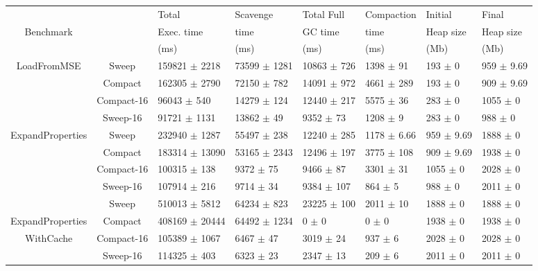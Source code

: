 \documentclass[10pt, sigplan]{acmart}
\begin{document}
\begin{figure}[thb]
\begin{tabular}{|c|c|l|l|l|l|l|l|}
   \hline
  & & Total   & Scavenge  & Total Full  & Compaction  & Initial  & Final \\
 Benchmark & &  Exec. time &  time & GC time &  time &  Heap size & Heap size \\
  & &  (ms) &  (ms) & (ms) &  (ms) &  (Mb) &  (Mb) \\
   \hline
   \multirow{4}{*}{LoadFromMSE} & Sweep 	& 159821 $\pm$ 2218 &	73599 $\pm$ 1281 	& 10863 $\pm$ 726 	&1398 $\pm$ 91 	& 193 $\pm$ 0 	& 959 $\pm$ 9.69 \\
    				    & Compact 	& 162305 $\pm$ 2790 &	72150 $\pm$ 782 	& 14091 $\pm$ 972 	&4661 $\pm$ 289 	& 193 $\pm$ 0 	& 909 $\pm$ 9.69 \\
    				    & Compact-16 	& 96043 $\pm$ 540 &	14279 $\pm$ 124 	& 12440 $\pm$ 217 	&5575 $\pm$ 36 	& 283 $\pm$ 0 	& 1055 $\pm$ 0 \\
    				    & Sweep-16 		& 91721 $\pm$ 1131 &	13862 $\pm$ 49 	& 9352 $\pm$ 73 	&1208 $\pm$ 9 	& 283 $\pm$ 0 	& 988 $\pm$ 0 \\
   \hline
   \multirow{4}{*}{ExpandProperties} 	& Sweep 		& 232940 $\pm$ 1287 &	55497 $\pm$ 238 	& 12240 $\pm$ 285 	&1178 $\pm$ 6.66 	& 959 $\pm$ 9.69 & 1888 $\pm$ 0 \\
    				    			& Compact 	& 183314 $\pm$ 13090 &	53165 $\pm$ 2343 	& 12496 $\pm$ 197 	&3775 $\pm$ 108 	& 909 $\pm$ 9.69 & 1938 $\pm$ 0 \\
    				    & Compact-16 	& 100315 $\pm$ 138 &	9372 $\pm$ 75 	& 9466 $\pm$ 87 	&3301 $\pm$ 31 	& 1055 $\pm$ 0 	& 2028 $\pm$ 0 \\
    				    & Sweep-16 		& 107914 $\pm$ 216 &	9714 $\pm$ 34 	& 9384 $\pm$ 107 	&864 $\pm$ 5 	& 988 $\pm$ 0 	& 2011 $\pm$ 0 \\
   \hline
    					& Sweep 		& 510013 $\pm$ 5812 	&	64234 $\pm$ 823 	& 23225 $\pm$ 100 	&2011 $\pm$ 10 	& 1888 $\pm$ 0 	& 1888 $\pm$ 0 \\
     	ExpandProperties	& Compact 	& 408169 $\pm$ 20444 	&	64492 $\pm$ 1234 	& 0 $\pm$ 0 		&0 $\pm$ 0 		& 1938 $\pm$ 0 	& 1938 $\pm$ 0 \\
    		WithCache	& Compact-16 	& 105389 $\pm$ 1067 	&	6467 $\pm$ 47 		& 3019 $\pm$ 24 	&937 $\pm$ 6 		& 2028 $\pm$ 0 	& 2028 $\pm$ 0 \\
    				    	& Sweep-16 	& 114325 $\pm$ 403 	&	6323 $\pm$ 23 		& 2347 $\pm$ 13 	&209 $\pm$ 6 		& 2011 $\pm$ 0 	& 2011 $\pm$ 0 \\

\end{tabular}
\end{figure}
\end{document}
